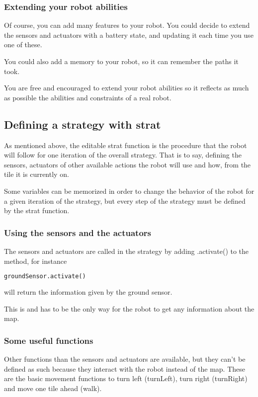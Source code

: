 \documentclass[a4paper,11pt]{article}
\begin{document}
\subsubsection{Extending your robot abilities}

Of course, you can add many features to your robot. You could decide
to extend the sensors and actuators with a battery state, and updating
it each time you use one of these.

You could also add a memory to your robot, so it can remember the
paths it took.

You are free and encouraged to extend your robot abilities so it
reflects as much as possible the abilities and constraints of a real
robot.

\subsection{Defining a strategy with strat}

As mentioned above, the editable strat function is the procedure that
the robot will follow for one iteration of the overall strategy.  That
is to say, defining the sensors, actuators of other available actions
the robot will use and how, from the tile it is currently on.

Some variables can be memorized in order to change the behavior of the
robot for a given iteration of the strategy, but every step of the
strategy must be defined by the strat function.

\subsubsection{Using the sensors and the actuators}

The sensors and actuators are called in the strategy by adding
.activate() to the method, for instance
\begin{lstlisting}[language=Python]
  groundSensor.activate()
\end{lstlisting}
will return the information given by the ground sensor.

This is and has to be the only way for the robot to get any
information about the map.

\subsubsection{Some useful functions}

Other functions than the sensors and actuators are available, but they
can't be defined as such because they interact with the robot instead
of the map. These are the basic movement functions to turn left
(turnLeft), turn right (turnRight) and move one tile ahead (walk).
\end{document}
